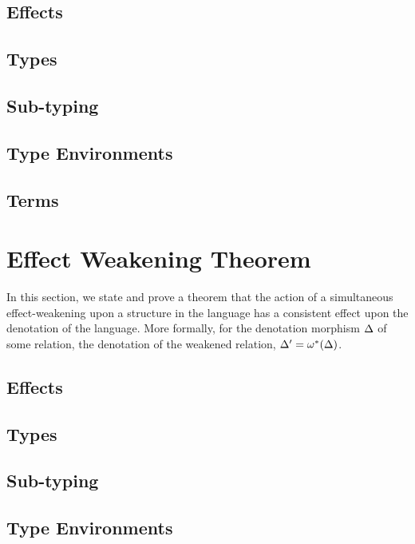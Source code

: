 \documentclass{report}
\begin{document}
\section{Effects}
\effectSubstitutionEffects

\section{Types}
\effectSubstitutionTypes

\section{Sub-typing}
\effectSubstitutionSubtyping{\cipw}

\section{Type Environments}
\effectSubstitutionTypeEnvs

\section{Terms}
\effectSubstitutionTerms

\chapter{Effect Weakening Theorem}
In this section, we state and prove a theorem that the action of a simultaneous effect-weakening upon a structure in the language has a consistent effect upon the denotation of the language. More formally, for the denotation morphism $\Delta$ of some relation, the denotation of the weakened relation, $\Delta' = \omega^*(\Delta)$.

\section{Effects}
\effectWeakeningEffects

\section{Types}
\effectWeakeningTypes

\section{Sub-typing}
\effectWeakeningSubtyping{\cipw}

\section{Type Environments}
\effectWeakeningTypeEnv
\end{document}
